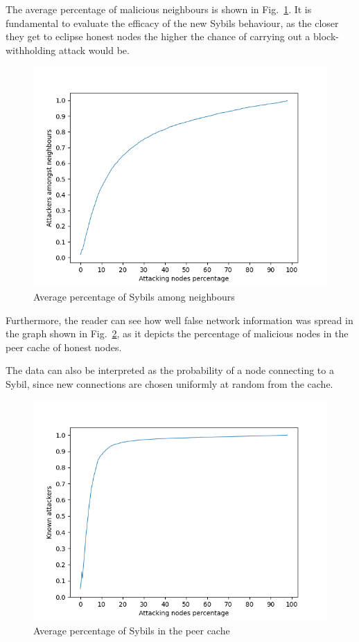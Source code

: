 The average percentage of malicious neighbours is shown in Fig.~\ref{fig:avgatk}. It is fundamental to evaluate the efficacy of the new Sybils behaviour, as the closer they get to eclipse honest nodes the higher the chance of carrying out a block-withholding attack would be.\par

\begin{figure}[h]
	\includegraphics[width=.8\textwidth]{pict/results/in-hon-avg-neigh-atk.png}
	\centering
	\caption{Average percentage of Sybils among neighbours}
	\label{fig:avgatk}
\end{figure}

Furthermore, the reader can see how well false network information was spread in the graph shown in Fig.~\ref{fig:avgatk-known}, as it depicts the percentage of malicious nodes in the peer cache of honest nodes.

The data can also be interpreted as the probability of a node connecting to a Sybil, since new connections are chosen uniformly at random from the cache.\par

\begin{figure}[h]
	\includegraphics[width=.8\textwidth]{pict/results/in-hon-avg-known-atk.png}
	\centering
	\caption{Average percentage of Sybils in the peer cache}
	\label{fig:avgatk-known}
\end{figure}


